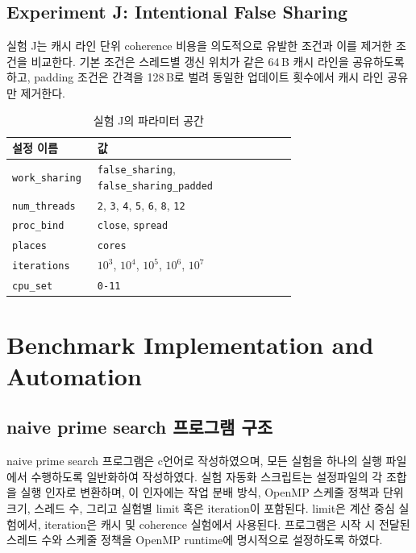 \documentclass[11pt,a4paper]{article}
\begin{document}
\subsection{Experiment J: Intentional False Sharing}

실험 J는 캐시 라인 단위 coherence 비용을 의도적으로 유발한 조건과 이를 제거한 조건을 비교한다. 기본 조건은 스레드별 갱신 위치가 같은 64\,B 캐시 라인을 공유하도록 하고, padding 조건은 간격을 128\,B로 벌려 동일한 업데이트 횟수에서 캐시 라인 공유만 제거한다.

\begin{table}[h]
\centering
\begin{tabular}{lp{0.70\linewidth}}
\toprule
설정 이름 & 값 \\
\midrule
\texttt{work\_sharing} & \texttt{false\_sharing}, \texttt{false\_sharing\_padded} \\
\texttt{num\_threads} & \texttt{2}, \texttt{3}, \texttt{4}, \texttt{5}, \texttt{6}, \texttt{8}, \texttt{12} \\
\texttt{proc\_bind} & \texttt{close}, \texttt{spread} \\
\texttt{places} & \texttt{cores} \\
\texttt{iterations} & $10^3$, $10^4$, $10^5$, $10^6$, $10^7$ \\
\texttt{cpu\_set} & \texttt{0-11} \\
\bottomrule
\end{tabular}
\caption{실험 J의 파라미터 공간}
\label{tab:expJ-space}
\end{table}

\section{Benchmark Implementation and Automation}

\subsection{naive prime search 프로그램 구조}

naive prime search 프로그램은 c언어로 작성하였으며, 모든 실험을 하나의 실행 파일에서 수행하도록 일반화하여 작성하였다. 실험 자동화 스크립트는 설정파일의 각 조합을 실행 인자로 변환하며, 이 인자에는 작업 분배 방식, OpenMP 스케줄 정책과 단위 크기, 스레드 수, 그리고 실험별 limit 혹은 iteration이 포함된다. limit은 계산 중심 실험에서, iteration은 캐시 및 coherence 실험에서 사용된다. 프로그램은 시작 시 전달된 스레드 수와 스케줄 정책을 OpenMP runtime에 명시적으로 설정하도록 하였다.
\end{document}
